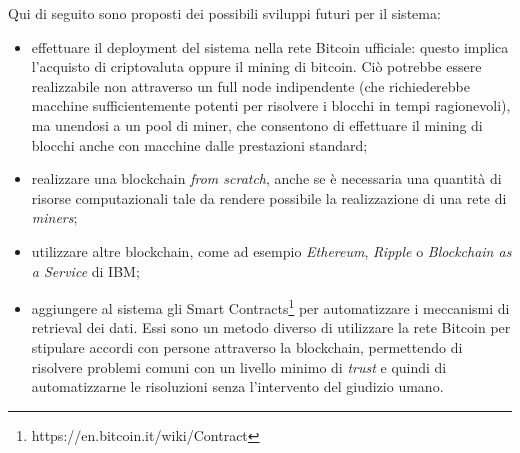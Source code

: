 Qui di seguito sono proposti dei possibili sviluppi futuri per il sistema: 
\begin{itemize}
    \item effettuare il deployment del sistema nella rete Bitcoin ufficiale: questo implica l'acquisto di criptovaluta oppure il mining di bitcoin. Ciò potrebbe essere realizzabile non attraverso un full node indipendente (che richiederebbe macchine sufficientemente potenti per risolvere i blocchi in tempi ragionevoli), ma unendosi a un pool di miner, che consentono di effettuare il mining di blocchi anche con macchine dalle prestazioni standard;
    \item realizzare una blockchain \textit{from scratch}, anche se è necessaria una quantità di risorse computazionali tale da rendere possibile la realizzazione di una rete di \textit{miners};
    \item utilizzare altre blockchain, come ad esempio \textit{Ethereum}, \textit{Ripple} o \textit{Blockchain as a Service} di IBM;
    \item aggiungere al sistema gli Smart Contracts\footnote{https://en.bitcoin.it/wiki/Contract} per automatizzare i meccanismi di retrieval dei dati. Essi sono un metodo diverso di utilizzare la rete Bitcoin per stipulare accordi con persone attraverso la blockchain, permettendo di risolvere problemi comuni con un livello minimo di \textit{trust} e quindi di automatizzarne le risoluzioni senza l'intervento del giudizio umano. 
\end{itemize}
